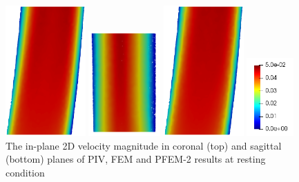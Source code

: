 \begin{figure}
\begin{minipage}[c][9.5cm][c]{0.28\textwidth}
\addtocounter{subfigure}{1}
\includegraphics[height=5cm]{imgs/vena_cava/FEM_sagittal_rest.png}
\end{minipage}
\begin{minipage}[c][9.5cm][c]{0.28\textwidth}
\centering
\vspace*{\fill}
\includegraphics[height=4cm]{imgs/vena_cava/PFEM_coronal_rest.png}

\addtocounter{subfigure}{1}
\includegraphics[height=5cm]{imgs/vena_cava/PFEM_sagittal_rest.png}
\end{minipage}
\begin{minipage}[c][9.5cm][t]{0.1\textwidth}
\vspace*{\fill}
\centering
\includegraphics[height=3cm]{imgs/vena_cava/colormap_rest.png}

\end{minipage}
\caption{The in-plane 2D velocity magnitude in coronal (top) and sagittal (bottom) planes of PIV, FEM and PFEM-2 results at resting condition}
\label{fig:process1}
\end{figure}

